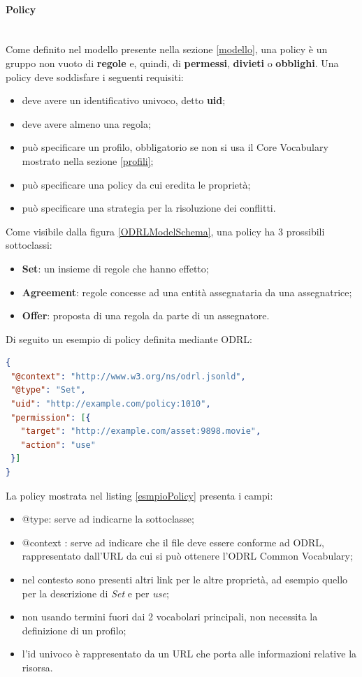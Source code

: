 \documentclass[12pt,a4paper,twoside]{book}
\begin{document}
\paragraph{Policy}\mbox{}\\
Come definito nel modello presente nella sezione \ref{modello}, una policy è un gruppo non vuoto di \textbf{regole} e, quindi, di \textbf{permessi}, \textbf{divieti} o \textbf{obblighi}. Una policy deve soddisfare i seguenti requisiti:
\begin{itemize}
	\item deve avere un identificativo univoco, detto \textbf{uid};
	\item deve avere almeno una regola;
	\item può specificare un profilo, obbligatorio se non si usa il Core Vocabulary mostrato nella sezione \ref{profili};
	\item può specificare una policy da cui eredita le proprietà;
	\item può specificare una strategia per la risoluzione dei conflitti.
\end{itemize}
Come visibile dalla figura \ref{ODRLModelSchema}, una policy ha 3 prossibili sottoclassi:
\begin{itemize}
	\item \textbf{Set}: un insieme di regole che hanno effetto;
	\item \textbf{Agreement}: regole concesse ad una entità assegnataria da una assegnatrice;
	\item \textbf{Offer}: proposta di una regola da parte di un assegnatore.
\end{itemize}
Di seguito un esempio di policy definita mediante ODRL:
\begin{lstlisting}[language=json,firstnumber=1,caption={Policy con sottoclasse \textbf{Set}},captionpos=b,label=esmpioPolicy]
{
 "@context": "http://www.w3.org/ns/odrl.jsonld",
 "@type": "Set",
 "uid": "http://example.com/policy:1010",
 "permission": [{
   "target": "http://example.com/asset:9898.movie",
   "action": "use"
 }]
}
\end{lstlisting}
La policy mostrata nel listing \ref{esmpioPolicy} presenta i campi:
\begin{itemize}
	\item @type: serve ad indicarne la sottoclasse;
	\item @context : serve ad indicare che il file deve essere conforme ad ODRL, rappresentato dall'URL da cui si può ottenere l'ODRL Common Vocabulary\cite{ODRLCV};
	\item nel contesto sono presenti altri link per le altre proprietà, ad esempio quello per la descrizione di \textit{Set} e per \textit{use};
	\item non usando termini fuori dai 2 vocabolari principali, non necessita la definizione di un profilo;
	\item l'id univoco è rappresentato da un URL che porta alle informazioni relative la risorsa.
\end{itemize}
\end{document}
